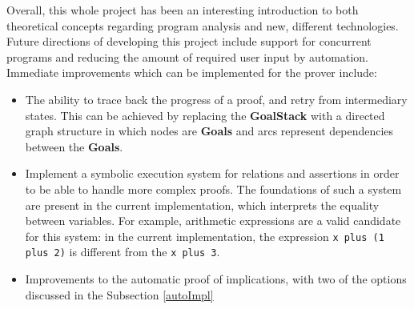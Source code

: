 \documentclass[12pt,a4paper]{article}
\begin{document}
Overall, this whole project has been an interesting introduction to both  theoretical concepts regarding program analysis and new, different technologies. 
\\

Future directions of developing this project include support for concurrent programs and reducing the amount of required user input by automation. Immediate improvements which can be implemented for the prover include:
\begin{itemize}
	\item The ability to trace back the progress of a proof, and retry from intermediary states. This can be achieved by replacing the \textbf{GoalStack} with a directed graph structure in which nodes are \textbf{Goals} and arcs represent dependencies between the \textbf{Goals}.
	\item Implement a symbolic execution system for relations and assertions in order to be able to handle more complex proofs. The foundations of such a system are present in the current implementation, which interprets the equality between variables. For example, arithmetic expressions are a valid candidate for this system: in the current implementation, the expression \texttt{x plus (1 plus 2)} is different from the \texttt{x plus 3}.
	\item Improvements to the automatic proof of implications, with two of the options discussed in the Subsection \ref{autoImpl}
\end{itemize}




\end{document}
